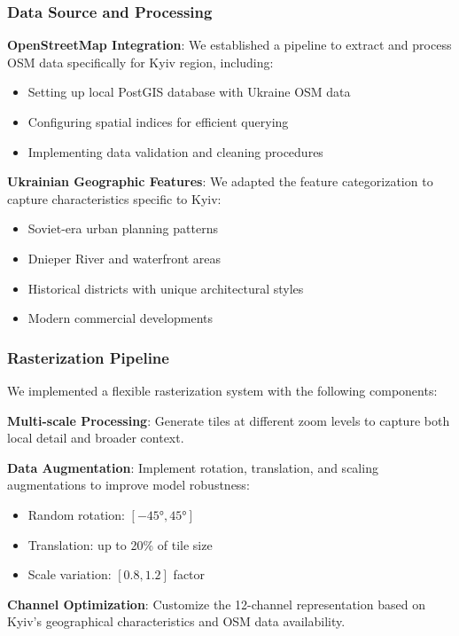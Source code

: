 \subsubsection{Data Source and Processing}

\textbf{OpenStreetMap Integration}: We established a pipeline to extract and process OSM data specifically for Kyiv region, including:
\begin{itemize}
    \item Setting up local PostGIS database with Ukraine OSM data
    \item Configuring spatial indices for efficient querying
    \item Implementing data validation and cleaning procedures
\end{itemize}

\textbf{Ukrainian Geographic Features}: We adapted the feature categorization to capture characteristics specific to Kyiv:
\begin{itemize}
    \item Soviet-era urban planning patterns
    \item Dnieper River and waterfront areas
    \item Historical districts with unique architectural styles
    \item Modern commercial developments
\end{itemize}

\subsubsection{Rasterization Pipeline}

We implemented a flexible rasterization system with the following components:

\textbf{Multi-scale Processing}: Generate tiles at different zoom levels to capture both local detail and broader context.

\textbf{Data Augmentation}: Implement rotation, translation, and scaling augmentations to improve model robustness:
\begin{itemize}
    \item Random rotation: $[-45°, 45°]$
    \item Translation: up to 20\% of tile size
    \item Scale variation: $[0.8, 1.2]$ factor
\end{itemize}

\textbf{Channel Optimization}: Customize the 12-channel representation based on Kyiv's geographical characteristics and OSM data availability.

